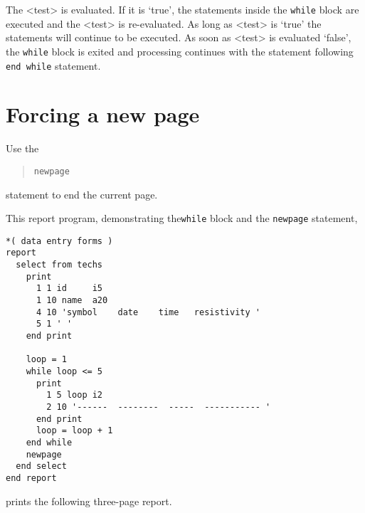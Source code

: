 \documentclass[11pt,a4paper]{report}
\def\I{\index}
\begin{document}
The <test> is evaluated.
If it is `true',
the statements inside the \verb!while! block are executed and the <test>
is re-evaluated. As long as <test> is `true' the statements will
continue to be executed.  As soon as <test> is evaluated `false',
the \verb!while! block is exited and processing continues
with the statement following \verb!end while! statement.
 
\section{Forcing a new page}
%
\I{newpage statement}
Use the
\begin{verse}
  \verb!newpage!
\end{verse}
statement to end the current page.
 
\demobreak
This report program, demonstrating the\verb!while! block
and the \verb!newpage! statement,
\label{while-inp}
\begin{verbatim}
*( data entry forms )
report
  select from techs
    print
      1 1 id     i5
      1 10 name  a20
      4 10 'symbol    date    time   resistivity '
      5 1 ' '
    end print
 
    loop = 1
    while loop <= 5
      print
        1 5 loop i2
        2 10 '------  --------  -----  ----------- '
      end print
      loop = loop + 1
    end while
    newpage
  end select
end report
\end{verbatim}
prints the following three-page report.
 
\label{while-rpt}
\end{document}
